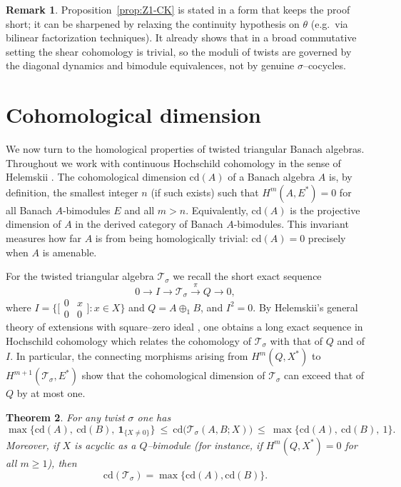 \documentclass{article}
\theoremstyle{plain}
\newtheorem{theorem}{Theorem}[section]
\theoremstyle{definition}
\newtheorem{remark}[theorem]{Remark}
\newcommand{\T}{\mathcal{T}}
\begin{document}
\begin{remark}
Proposition~\ref{prop:Z1-CK} is stated in a form that keeps the proof short; it can be sharpened by relaxing the continuity hypothesis on $\theta$ (e.g.\ via bilinear factorization techniques).
It already shows that in a broad commutative setting the shear cohomology is trivial, so the moduli of twists are governed by the diagonal dynamics and bimodule equivalences, not by genuine $\sigma$–cocycles.
\end{remark}







\section{Cohomological dimension}

We now turn to the homological properties of twisted triangular Banach algebras.
Throughout we work with continuous Hochschild cohomology in the sense of Helemskii \cite{HelemskiiHomology}.
The cohomological dimension $\mathrm{cd}(A)$ of a Banach algebra $A$ is, by definition, the smallest integer $n$ (if such exists) such that $H^{m}(A,E^*)=0$ for all Banach $A$-bimodules $E$ and all $m>n$.
Equivalently, $\mathrm{cd}(A)$ is the projective dimension of $A$ in the derived category of Banach $A$-bimodules.
This invariant measures how far $A$ is from being homologically trivial: $\mathrm{cd}(A)=0$ precisely when $A$ is amenable.

For the twisted triangular algebra $\T_\sigma$ we recall the short exact sequence
\[
0\longrightarrow I \longrightarrow \T_\sigma \xrightarrow{\pi} Q \longrightarrow 0,
\]
where $I=\{\bigl[\begin{smallmatrix}0&x\\ 0&0\end{smallmatrix}\bigr]:x\in X\}$ and $Q=A\oplus_1 B$, and $I^2=0$.
By Helemskii’s general theory of extensions with square--zero ideal \cite[§31]{HelemskiiHomology}, one obtains a long exact sequence in Hochschild cohomology which relates the cohomology of $\T_\sigma$ with that of $Q$ and of $I$.
In particular, the connecting morphisms arising from $H^m(Q,X^*)$ to $H^{m+1}(\T_\sigma,E^*)$ show that the cohomological dimension of $\T_\sigma$ can exceed that of $Q$ by at most one.

\begin{theorem}\label{thm:cd}
For any twist $\sigma$ one has
\[
\max\bigl\{\mathrm{cd}(A),\ \mathrm{cd}(B),\ \mathbf{1}_{\{X\neq0\}}\bigr\}
\ \le\
\mathrm{cd}\bigl(\T_\sigma(A,B;X)\bigr)
\ \le\
\max\bigl\{\mathrm{cd}(A),\ \mathrm{cd}(B),\ 1\bigr\}.
\]
Moreover, if $X$ is acyclic as a $Q$--bimodule (for instance, if $H^m(Q,X^*)=0$ for all $m\ge1$), then
\[
\mathrm{cd}(\T_\sigma)=\max\{\mathrm{cd}(A),\mathrm{cd}(B)\}.
\]
\end{theorem}
\end{document}
